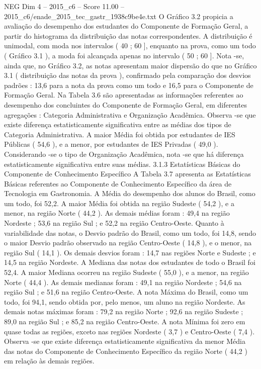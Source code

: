 \begin{textsample}{NEG Dim 4 – 2015\_c6 – Score 11.00 – 2015\_c6/enade\_2015\_tec\_gastr\_1938c9be4e.txt}
O Gráfico 3.2 propicia a avaliação do desempenho dos estudantes do Componente de Formação Geral, a partir do histograma da distribuição das notas correspondentes.
A distribuição é unimodal, com moda nos intervalos ( 40 ; 60 ], enquanto na prova, como um todo ( Gráfico 3.1 ), a moda foi alcançada apenas no intervalo ( 50 ; 60 ].
Nota -se, ainda que, no Gráfico 3.2, as notas apresentam maior dispersão do que no Gráfico 3.1 ( distribuição das notas da prova ), confirmado pela comparação dos desvios padrões : 13,6 para a nota da prova como um todo e 16,5 para o Componente de Formação Geral.
Na Tabela 3.6 são apresentadas as informações referentes ao desempenho dos concluintes do Componente de Formação Geral, em diferentes agregações : Categoria Administrativa e Organização Acadêmica.
Observa -se que existe diferença estatisticamente significativa entre as médias dos tipos de Categoria Administrativa.
A maior Média foi obtida por estudantes de IES Públicas ( 54,6 ), e a menor, por estudantes de IES Privadas ( 49,0 ).
Considerando -se o tipo de Organização Acadêmica, nota -se que há diferença estatisticamente significativa entre suas médias. 3.1.3 Estatísticas Básicas do Componente de Conhecimento Específico A Tabela 3.7 apresenta as Estatísticas Básicas referentes ao Componente de Conhecimento Específico da área de Tecnologia em Gastronomia.
A Média do desempenho dos alunos do Brasil, como um todo, foi 52,2.
A maior Média foi obtida na região Sudeste ( 54,2 ), e a menor, na região Norte ( 44,2 ).
As demais médias foram : 49,4 na região Nordeste ; 53,6 na região Sul ; e 52,2 na região Centro-Oeste.
Quanto à variabilidade das notas, o Desvio padrão do Brasil, como um todo, foi 14,8, sendo o maior Desvio padrão observado na região Centro-Oeste ( 14,8 ), e o menor, na região Sul ( 14,1 ).
Os demais desvios foram : 14,7 nas regiões Norte e Sudeste ; e 14,5 na região Nordeste.
A Mediana das notas dos estudantes de todo o Brasil foi 52,4.
A maior Mediana ocorreu na região Sudeste ( 55,0 ), e a menor, na região Norte ( 44,4 ).
As demais medianas foram : 49,1 na região Nordeste ; 54,6 na região Sul ; e 51,6 na região Centro-Oeste.
A nota Máxima do Brasil, como um todo, foi 94,1, sendo obtida por, pelo menos, um aluno na região Nordeste.
As demais notas máximas foram : 79,2 na região Norte ; 92,6 na região Sudeste ; 89,0 na região Sul ; e 85,2 na região Centro-Oeste.
A nota Mínima foi zero em quase todas as regiões, exceto nas regiões Nordeste ( 3,7 ) e Centro-Oeste ( 7,4 ).
Observa -se que existe diferença estatisticamente significativa da menor Média das notas do Componente de Conhecimento Específico da região Norte ( 44,2 ) em relação às demais regiões.

\end{textsample}
